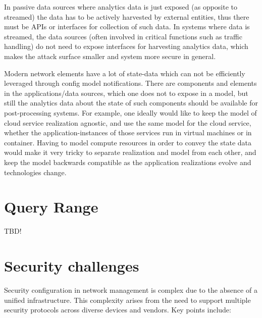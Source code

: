 \documentclass[11pt,sigconf]{iabart}
\begin{document}
In passive data sources where analytics data is just exposed (as opposite to streamed) the data has to be actively harvested by external entities, thus there must be APIs or interfaces for collection of such data. In systems where data is streamed, the data sources (often involved in critical functions such as traffic handling) do not need to expose interfaces for harvesting analytics data, which makes the attack surface smaller and system more secure in general.

Modern network elements have a lot of state-data which can not be efficiently leveraged through config model notifications. There are components and elements in the applications/data sources, which one does not to expose in a model, but still the analytics data about the state of such components should be available for post-processing systems. For example, one ideally would like to keep the model of cloud service realization agnostic, and use the same model for the cloud service, whether the application-instances of those services run in virtual machines or in container. Having to model compute resources in order to convey the state data would make it very tricky to separate realization and model from each other, and keep the model backwards compatible as the application realizations evolve and technologies change.

\section{Query Range} \label{queryrange} 


TBD!

\section{Security challenges} \label{security}

Security configuration in network management is complex due to the absence of a unified infrastructure. This complexity arises from the need to support multiple security protocols across diverse devices and vendors. Key points include:
\end{document}
